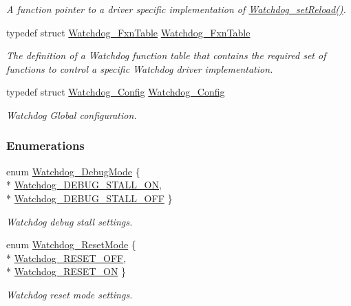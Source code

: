 \begin{DoxyCompactItemize}
\begin{DoxyCompactList}\small\item\em A function pointer to a driver specific implementation of \hyperlink{_watchdog_8h_a77ec81e1304fe05b77a9976e10e2d9a3}{Watchdog\-\_\-set\-Reload()}. \end{DoxyCompactList}\item 
typedef struct \hyperlink{struct_watchdog___fxn_table}{Watchdog\-\_\-\-Fxn\-Table} \hyperlink{_watchdog_8h_ad3e804ec79af5e10e8ef3af301860ef5}{Watchdog\-\_\-\-Fxn\-Table}
\begin{DoxyCompactList}\small\item\em The definition of a Watchdog function table that contains the required set of functions to control a specific Watchdog driver implementation. \end{DoxyCompactList}\item 
typedef struct \hyperlink{struct_watchdog___config}{Watchdog\-\_\-\-Config} \hyperlink{_watchdog_8h_ad8c9eb8a1cd2934965d385293fc38647}{Watchdog\-\_\-\-Config}
\begin{DoxyCompactList}\small\item\em Watchdog Global configuration. \end{DoxyCompactList}\end{DoxyCompactItemize}
\subsubsection*{Enumerations}
\begin{DoxyCompactItemize}
\item 
enum \hyperlink{_watchdog_8h_ab1aa5862661c88a16b9d7bc12709d51e}{Watchdog\-\_\-\-Debug\-Mode} \{ \\*
\hyperlink{_watchdog_8h_ab1aa5862661c88a16b9d7bc12709d51ea787c87976091a6f294070dadd1747ed0}{Watchdog\-\_\-\-D\-E\-B\-U\-G\-\_\-\-S\-T\-A\-L\-L\-\_\-\-O\-N}, 
\\*
\hyperlink{_watchdog_8h_ab1aa5862661c88a16b9d7bc12709d51ea745be9d89bc0c15eda5c4082020f8bb2}{Watchdog\-\_\-\-D\-E\-B\-U\-G\-\_\-\-S\-T\-A\-L\-L\-\_\-\-O\-F\-F}
 \}
\begin{DoxyCompactList}\small\item\em Watchdog debug stall settings. \end{DoxyCompactList}\item 
enum \hyperlink{_watchdog_8h_ada0db7216129d7dad494bb0cd0169f88}{Watchdog\-\_\-\-Reset\-Mode} \{ \\*
\hyperlink{_watchdog_8h_ada0db7216129d7dad494bb0cd0169f88a78ba6b49345f0116143f4d4e7a9ec488}{Watchdog\-\_\-\-R\-E\-S\-E\-T\-\_\-\-O\-F\-F}, 
\\*
\hyperlink{_watchdog_8h_ada0db7216129d7dad494bb0cd0169f88aafccd6330c396d9ffc2786524625bf1f}{Watchdog\-\_\-\-R\-E\-S\-E\-T\-\_\-\-O\-N}
 \}
\begin{DoxyCompactList}\small\item\em Watchdog reset mode settings. \end{DoxyCompactList}\end{DoxyCompactItemize}
